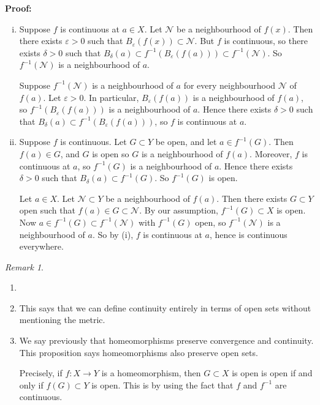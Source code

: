 \documentclass[12pt]{article}
\theoremstyle{definition}
\theoremstyle{remark}
\newtheorem*{remark}{Remark}
\begin{document}
\begin{adjustbox}{minipage = \columnwidth - 25.5pt, margin=1em, frame=1pt, margin=0em}
\textbf{Proof:}
\begin{enumerate}[(i)]
	\item Suppose $f$ is continuous at $a \in X$. Let $\mathcal{N}$ be a neighbourhood of $f(x)$. Then there exists $\varepsilon > 0$ such that $B_{\varepsilon}(f(x)) \subset \mathcal{N}$. But $f$ is continuous, so there exists $\delta > 0$ such that $B_{\delta}(a) \subset f^{-1}(B_{\varepsilon}(f(a))) \subset f^{-1}(\mathcal{N})$. So $f^{-1}(\mathcal{N})$ is a neighbourhood of $a$.

		Suppose $f^{-1}(\mathcal{N})$ is a neighbourhood of $a$ for every neighbourhood $\mathcal{N}$ of $f(a)$. Let $\varepsilon > 0$. In particular, $B_{\varepsilon}(f(a))$ is a neighbourhood of $f(a)$, so $f^{-1}(B_{\varepsilon}(f(a)))$ is a neighbourhood of $a$. Hence there exists $\delta > 0$ such that $B_{\delta}(a) \subset f^{-1}(B_{\varepsilon}(f(a)))$, so $f$ is continuous at $a$.

	\item Suppose $f$ is continuous. Let $G \subset Y$ be open, and let $a \in f^{-1}(G)$. Then $f(a) \in G$, and $G$ is open so $G$ is a neighbourhood of $f(a)$. Moreover, $f$ is continuous at $a$, so $f^{-1}(G)$ is a neighbourhood of $a$.  Hence there exists $\delta > 0$ such that $B_{\delta}(a) \subset f^{-1}(G)$. So $f^{-1}(G)$ is open.

		Let $a \in X$. Let $\mathcal{N} \subset Y$ be a neighbourhood of $f(a)$. Then there exists $G \subset Y$ open such that $f(a) \in G \subset \mathcal{N}$. By our assumption, $f^{-1}(G) \subset X$ is open. Now $a \in f^{-1}(G) \subset f^{-1}(\mathcal{N})$ with $f^{-1}(G)$ open, so $f^{-1}(\mathcal{N})$ is a neighbourhood of $a$. So by (i), $f$ is continuous at $a$, hence is continuous everywhere.
\end{enumerate}
\end{adjustbox}

\begin{remark}
	\begin{enumerate}[1.]
		\item[]
		\item This says that we can define continuity entirely in terms of open sets without mentioning the metric.
		\item We say previously that homeomorphisms preserve convergence and continuity. This proposition says homeomorphisms also preserve open sets.

			Precisely, if $f : X \to Y$ is a homeomorphism, then $G \subset X$ is open is open if and only if $f(G) \subset Y$ is open. This is by using the fact that $f$ and $f^{-1}$ are continuous.
	\end{enumerate}
\end{remark}
\end{document}
